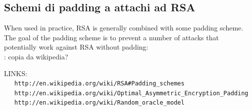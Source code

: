 \documentclass[pdflatex,11pt,a4paper,oneside]{article}
\let\OldEmph\emph
\renewcommand{\emph}[1]{\OldEmph{#1\/}}
\newcommand{\XXX}[1][XXX]{\text{\bfseries{\color{red}{\emph{#1}}}}}
\newcommand{\TODO}[0]{\XXX[TODO]}
\begin{document}
\subsection{Schemi di padding a attachi ad RSA}\label{sect:rsa-attacks}

When used in practice, RSA is generally combined with some padding scheme.
The goal of the padding scheme is to prevent a number of attacks that
potentially work against RSA without padding:\\
\TODO: copia da wikipedia?

LINKS:\\
~~~\verb+http://en.wikipedia.org/wiki/RSA#Padding_schemes+\\
~~~\verb+http://en.wikipedia.org/wiki/Optimal_Asymmetric_Encryption_Padding+
~~~\verb+http://en.wikipedia.org/wiki/Random_oracle_model+

\end{document}
